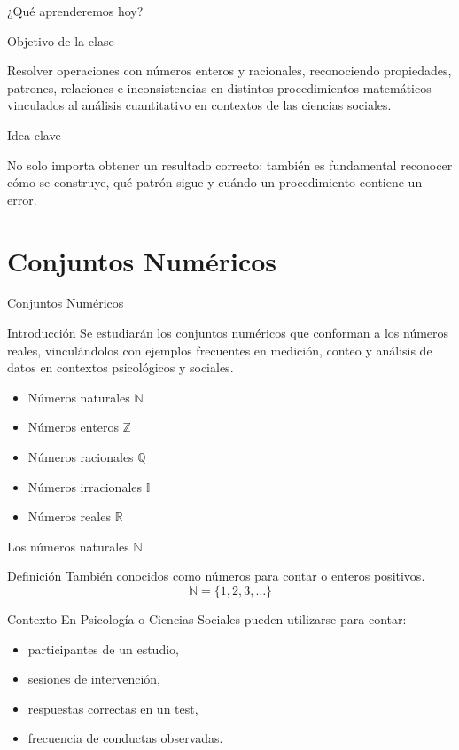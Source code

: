 \documentclass[handout,aspectratio=169,10pt]{beamer}
\newcommand{\IdeaClave}[1]{
	\begin{exampleblock}{Idea clave}
		#1
	\end{exampleblock}
}
\newcommand{\ObjetivoClase}[1]{
	\begin{block}{Objetivo de la clase}
		#1
	\end{block}
}
\begin{document}
	\begin{frame}{¿Qué aprenderemos hoy?}
		\ObjetivoClase{
			Resolver operaciones con números enteros y racionales, reconociendo propiedades, patrones, relaciones e inconsistencias en distintos procedimientos matemáticos vinculados al análisis cuantitativo en contextos de las ciencias sociales.
		}
		
		\IdeaClave{
			No solo importa obtener un resultado correcto: también es fundamental reconocer cómo se construye, qué patrón sigue y cuándo un procedimiento contiene un error.
		}
	\end{frame}
	
	\section{Conjuntos Numéricos}
	
	\begin{frame}{Conjuntos Numéricos}
		\begin{block}{Introducción}
			Se estudiarán los conjuntos numéricos que conforman a los números reales, vinculándolos con ejemplos frecuentes en medición, conteo y análisis de datos en contextos psicológicos y sociales.
		\end{block}
		
		\begin{itemize}[<+->]
			\item Números naturales \(\mathbb{N}\)
			\item Números enteros \(\mathbb{Z}\)
			\item Números racionales \(\mathbb{Q}\)
			\item Números irracionales \(\mathbb{I}\)
			\item Números reales \(\mathbb{R}\)
		\end{itemize}
	\end{frame}
	
	\begin{frame}{Los números naturales \(\mathbb{N}\)}
		\begin{block}{Definición}
			También conocidos como números para contar o enteros positivos.
			\[
			\mathbb{N}=\{1,2,3,\dots\}
			\]
		\end{block}
		
		\begin{exampleblock}{Contexto}
			En Psicología o Ciencias Sociales pueden utilizarse para contar:
			\begin{itemize}
				\item participantes de un estudio,
				\item sesiones de intervención,
				\item respuestas correctas en un test,
				\item frecuencia de conductas observadas.
			\end{itemize}
		\end{exampleblock}
	\end{frame}
	
\end{document}
